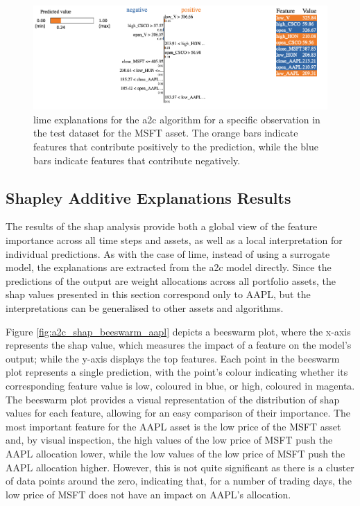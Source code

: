 \begin{figure}
    \centering
    \includegraphics[width=\textwidth]{figures/a2c_lime_msft.png}
    \caption{\acrshort{lime} explanations for the \acrshort{a2c} algorithm for a specific observation in the test dataset for the MSFT asset. The orange bars indicate features that contribute positively to the prediction, while the blue bars indicate features that contribute negatively.}
    \label{fig:a2c_lime_msft}
\end{figure}

\subsection{Shapley Additive Explanations Results} \label{sec:shap-results}

The results of the \acrshort{shap} analysis provide both a global view of the feature importance across all time steps and assets, as well as a local interpretation for individual predictions. As with the case of \acrshort{lime}, instead of using a surrogate model, the explanations are extracted from the \acrshort{a2c} model directly. Since the predictions of the output are weight allocations across all portfolio assets, the \acrshort{shap} values presented in this section correspond only to AAPL, but the interpretations can be generalised to other assets and algorithms.

Figure \ref{fig:a2c_shap_beeswarm_aapl} depicts a beeswarm plot, where the x-axis represents the \acrshort{shap} value, which measures the impact of a feature on the model's output; while the y-axis displays the top features. Each point in the beeswarm plot represents a single prediction, with the point's colour indicating whether its corresponding feature value is low, coloured in blue, or high, coloured in magenta. The beeswarm plot provides a visual representation of the distribution of \acrshort{shap} values for each feature, allowing for an easy comparison of their importance. The most important feature for the AAPL asset is the low price of the MSFT asset and, by visual inspection, the high values of the low price of MSFT push the AAPL allocation lower, while the low values of the low price of MSFT push the AAPL allocation higher. However, this is not quite significant as there is a cluster of data points around the zero, indicating that, for a number of trading days, the low price of MSFT does not have an impact on AAPL's allocation. 


